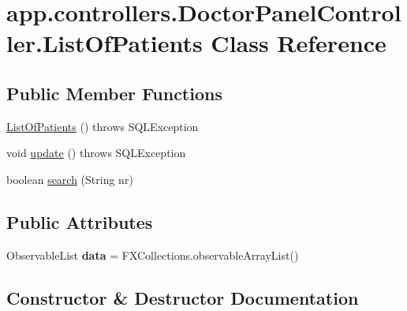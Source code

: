 \hypertarget{classapp_1_1controllers_1_1_doctor_panel_controller_1_1_list_of_patients}{}\section{app.\+controllers.\+Doctor\+Panel\+Controller.\+List\+Of\+Patients Class Reference}
\label{classapp_1_1controllers_1_1_doctor_panel_controller_1_1_list_of_patients}
\subsection*{Public Member Functions}
\begin{DoxyCompactItemize}
\item 
\mbox{\hyperlink{classapp_1_1controllers_1_1_doctor_panel_controller_1_1_list_of_patients_ae1f6e7104c1bbcbf91b706dffe07f504}{List\+Of\+Patients}} ()  throws S\+Q\+L\+Exception 
\item 
void \mbox{\hyperlink{classapp_1_1controllers_1_1_doctor_panel_controller_1_1_list_of_patients_a60e94cce0b803fde7146aa6e16c71958}{update}} ()  throws S\+Q\+L\+Exception 
\item 
boolean \mbox{\hyperlink{classapp_1_1controllers_1_1_doctor_panel_controller_1_1_list_of_patients_aaf2f528dced80e98416b78dd695655fb}{search}} (String nr)
\end{DoxyCompactItemize}
\subsection*{Public Attributes}
\begin{DoxyCompactItemize}
\item 
\mbox{\label{classapp_1_1controllers_1_1_doctor_panel_controller_1_1_list_of_patients_abca31a9efc6a27e5f77f7a25e2e547ea}} 
Observable\+List {\bfseries data} = F\+X\+Collections.\+observable\+Array\+List()
\end{DoxyCompactItemize}


\subsection{Constructor \& Destructor Documentation}
\mbox{\label{classapp_1_1controllers_1_1_doctor_panel_controller_1_1_list_of_patients_ae1f6e7104c1bbcbf91b706dffe07f504}} 
